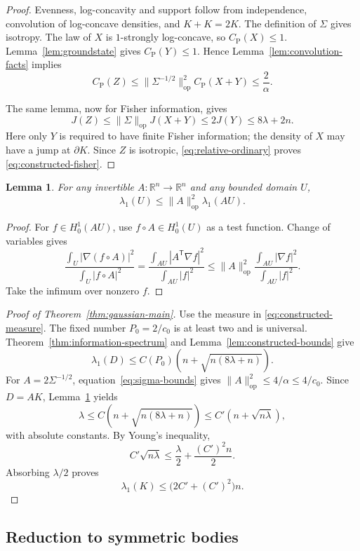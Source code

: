 \documentclass[11pt]{amsart}
\numberwithin{equation}{section}
\newtheorem{lemma}[theorem]{Lemma}
\theoremstyle{definition}
\theoremstyle{remark}
\newcommand{\R}{\mathbb R}
\newcommand{\CP}{C_{\mathrm P}}
\newcommand{\op}{\mathrm{op}}
\newcommand{\norm}[1]{\lVert #1\rVert}
\begin{document}
\begin{proof}
Evenness, log-concavity and support follow from independence,
convolution of log-concave densities, and \(K+K=2K\).
The definition of \(\Sigma\) gives isotropy.
The law of \(X\) is \(1\)-strongly log-concave, so
\(\CP(X)\le1\). Lemma~\ref{lem:groundstate} gives
\(\CP(Y)\le1\). Hence Lemma~\ref{lem:convolution-facts} implies
\[
\CP(Z)\le\norm{\Sigma^{-1/2}}_{\op}^2\CP(X+Y)
\le\frac2\alpha.
\]

The same lemma, now for Fisher information, gives
\[
J(Z)\le\norm{\Sigma}_{\op}J(X+Y)
\le2J(Y)\le8\lambda+2n.
\]
Here only \(Y\) is required to have finite Fisher information; the
density of \(X\) may have a jump at \(\partial K\).
Since \(Z\) is isotropic, \eqref{eq:relative-ordinary} proves
\eqref{eq:constructed-fisher}.
\end{proof}

\begin{lemma}\label{lem:linear-rayleigh}
For any invertible \(A:\R^n\to\R^n\) and any bounded domain \(U\),
\[
\lambda_1(U)\le\norm A_{\op}^2\lambda_1(AU).
\]
\end{lemma}

\begin{proof}
For \(f\in H_0^1(AU)\), use \(f\circ A\in H_0^1(U)\) as a test
function. Change of variables gives
\[
\frac{\int_U|\nabla(f\circ A)|^2}{\int_U|f\circ A|^2}
=
\frac{\int_{AU}|A^{\mathsf T}\nabla f|^2}{\int_{AU}|f|^2}
\le\norm A_{\op}^2
\frac{\int_{AU}|\nabla f|^2}{\int_{AU}|f|^2}.
\]
Take the infimum over nonzero \(f\).
\end{proof}

\begin{proof}[Proof of Theorem~\ref{thm:gaussian-main}]
Use the measure in \eqref{eq:constructed-measure}.
The fixed number \(P_0=2/c_0\) is at least two and is universal.
Theorem~\ref{thm:information-spectrum} and
Lemma~\ref{lem:constructed-bounds} give
\[
\lambda_1(D)
\le C(P_0)\left(n+\sqrt{n(8\lambda+n)}\right).
\]
For \(A=2\Sigma^{-1/2}\), equation~\eqref{eq:sigma-bounds} gives
\(\norm A_{\op}^2\le4/\alpha\le4/c_0\).
Since \(D=AK\), Lemma~\ref{lem:linear-rayleigh} yields
\[
\lambda
\le C\left(n+\sqrt{n(8\lambda+n)}\right)
\le C'\left(n+\sqrt{n\lambda}\right),
\]
with absolute constants. By Young's inequality,
\[
C'\sqrt{n\lambda}
\le\frac{\lambda}{2}+\frac{(C')^2n}{2}.
\]
Absorbing \(\lambda/2\) proves
\[
\lambda_1(K)\le\bigl(2C'+(C')^2\bigr)n.
\]
\end{proof}

\subsection{Reduction to symmetric bodies}
\label{sec:general-case}
\end{document}
